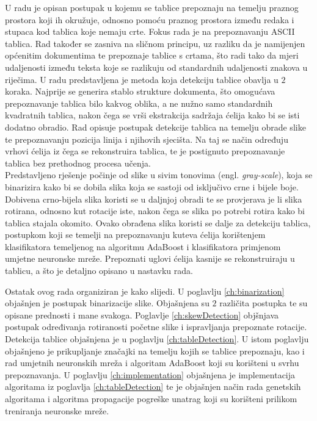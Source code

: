 \documentclass[times, utf8, zavrsni, numeric]{fer}
\begin{document}
U radu \cite{article:Medium-IndependentTableDetection} je opisan postupak u kojemu se tablice prepoznaju na temelju praznog prostora koji ih okružuje, odnosno pomoću praznog prostora između redaka i stupaca kod tablica koje nemaju crte. Fokus rada je na prepoznavanju ASCII tablica. Rad \cite{article:SimpleAndEffectiveTableDetectionSystemFromDocumentImages} također se zasniva na sličnom principu, uz razliku da je namijenjen općenitim dokumentima te prepoznaje tablice s crtama, što radi tako da mjeri udaljenosti između teksta koje se razlikuju od standardnih udaljenosti znakova u riječima.
U radu \cite{LayoutRecognitionofTable-Form} predstavljena je metoda koja detekciju tablice obavlja u $2$ koraka.
Najprije se generira stablo strukture dokumenta, što omogućava prepoznavanje tablica bilo kakvog oblika, a ne nužno samo standardnih kvadratnih tablica, nakon čega se vrši ekstrakcija sadržaja ćelija kako bi se isti dodatno obradio.
Rad \cite{conference:AutomaticTableDetectionInDocumentImages} opisuje postupak detekcije tablica na temelju obrade slike te prepoznavanju pozicija linija i njihovih sjecišta.
Na taj se način određuju vrhovi ćelija iz čega se rekonstruira tablica, te je postignuto prepoznavanje tablica bez prethodnog procesa učenja.
\\

Predstavljeno rješenje počinje od slike u sivim tonovima (engl. \textit{gray-scale}), koja se binarizira kako bi se dobila slika koja se sastoji od isključivo crne i bijele boje.
Dobivena crno-bijela slika koristi se u daljnjoj obradi te se provjerava je li slika rotirana, odnosno kut rotacije iste, nakon čega se slika po potrebi rotira kako bi tablica stajala okomito.
Ovako obrađena slika koristi se dalje za detekciju tablica, postupkom koji se temelji na prepoznavanju kuteva ćelija korištenjem klasifikatora temeljenog na algoritmu AdaBoost i klasifikatora primjenom umjetne neuronske mreže.
Prepoznati uglovi ćelija kasnije se rekonstruiraju u tablicu, a što je detaljno opisano u nastavku rada.

Ostatak ovog rada organiziran je kako slijedi.
U poglavlju \ref{ch:binarization} objašnjen je postupak binarizacije slike.
Objašnjena su $2$ različita postupka te su opisane prednosti i mane svakoga.
Poglavlje \ref{ch:skewDetection} objšnjava postupak određivanja rotiranosti početne slike i ispravljanja prepoznate rotacije.
Detekcija tablice objašnjena je u poglavlju \ref{ch:tableDetection}.
U istom poglavlju objašnjeno je prikupljanje značajki na temelju kojih se tablice prepoznaju, kao i rad umjetnih neuronskih mreža i algoritam AdaBoost koji su korišteni u svrhu prepoznavanja.
U poglavlju \ref{ch:implementation} objašnjena je implementacija algoritama iz poglavlja \ref{ch:tableDetection} te je objašnjen način rada genetskih algoritama i algoritma propagacije pogreške unatrag koji su korišteni prilikom treniranja neuronske mreže.
\end{document}
